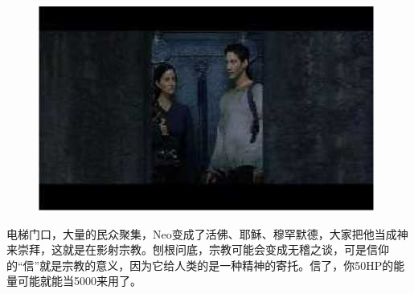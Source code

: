 \documentclass[UTF8]{ctexart}
\begin{document}
\begin{figure}[htb]
\centering
\includegraphics[width=0.5\linewidth]{fig/read_reloaded-38}
\end{figure}

电梯门口，大量的民众聚集，Neo变成了活佛、耶稣、穆罕默德，大家把他当成神来崇拜，这就是在影射宗教。刨根问底，宗教可能会变成无稽之谈，可是信仰的“信”就是宗教的意义，因为它给人类的是一种精神的寄托。信了，你50HP的能量可能就能当5000来用了。
\end{document}
